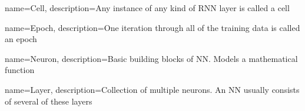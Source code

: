 
{
	name={Cell},
	description={Any instance of any kind of RNN layer is called a cell}
}

{
  name={Epoch},
  description={One iteration through all of the training data is called an epoch}
}

{
  name={Neuron},
  description={Basic building blocks of NN. Models a mathematical function}
}

{
  name={Layer},
  description={Collection of multiple neurons. An NN usually consists of several of these layers}
}


